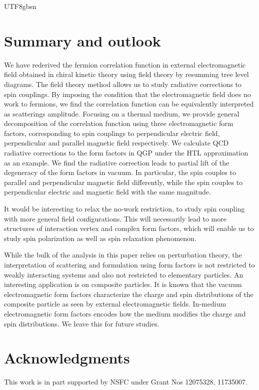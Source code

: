 \documentclass[11pt]{article}\def\baselinestretch{1.4}
\begin{document}
\begin{CJK}{UTF8}{gbsn}


\section{Summary and outlook}\label{sec_outlook}

We have rederived the fermion correlation function in external electromagnetic field obtained in chiral kinetic theory using field theory by resumming tree level diagrams. The field theory method allows us to study radiative corrections to spin couplings. By imposing the condition that the electromagnetic field does no work to fermions, we find the correlation function can be equivalently interpreted as scatterings amplitude. Focusing on a thermal medium, we provide general decomposition of the correlation function using three electromagnetic form factors, corresponding to spin couplings to perpendicular electric field, perpendicular and parallel magnetic field respectively. We calculate QCD radiative corrections to the form factors in QGP under the HTL approximation as an example. We find the radiative correction leads to partial lift of the degeneracy of the form factors in vacuum. In particular, the spin couples to parallel and perpendicular magnetic field differently, while the spin couples to perpendicular electric and magnetic field with the same magnitude.

It would be interesting to relax the no-work restriction, to study spin coupling with more general field configurations. This will necessarily lead to more structures of interaction vertex and complex form factors, which will enable us to study spin polarization as well as spin relaxation phenomenon.

While the bulk of the analysis in this paper relies on perturbation theory, the interpretation of scattering and formulation using form factors is not restricted to weakly interacting systems and also not restricted to elementary particles. An interesting application is on composite particles. It is known that the vacuum electromagnetic form factors characterize the charge and spin distributions of the composite particle as seen by external electromagnetic fields. In-medium electromagnetic form factors encodes how the medium modifies the charge and spin distributions. We leave this for future studies.


\section*{Acknowledgments}
This work is in part supported by NSFC under Grant Nos 12075328, 11735007.


\end{CJK}
\end{document}
